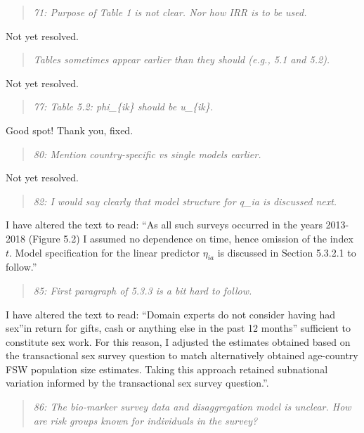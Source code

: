\documentclass[
  12pt,
]{article}
\begin{document}
\begin{quote}
\emph{71: Purpose of Table 1 is not clear. Nor how IRR is to be used.}
\end{quote}

Not yet resolved.

\begin{quote}
\emph{Tables sometimes appear earlier than they should (e.g., 5.1 and
5.2).}
\end{quote}

Not yet resolved.

\begin{quote}
\emph{77: Table 5.2: phi\_\{ik\} should be u\_\{ik\}.}
\end{quote}

Good spot! Thank you, fixed.

\begin{quote}
\emph{80: Mention country-specific vs single models earlier.}
\end{quote}

Not yet resolved.

\begin{quote}
\emph{82: I would say clearly that model structure for q\_ia is
discussed next.}
\end{quote}

I have altered the text to read: ``As all such surveys occurred in the
years 2013-2018 (Figure 5.2) I assumed no dependence on time, hence
omission of the index \(t\). Model specification for the linear
predictor \(\eta_{ia}\) is discussed in Section 5.3.2.1 to follow.''

\begin{quote}
\emph{85: First paragraph of 5.3.3 is a bit hard to follow.}
\end{quote}

I have altered the text to read: ``Domain experts do not consider having
had sex''in return for gifts, cash or anything else in the past 12
months'' sufficient to constitute sex work. For this reason, I adjusted
the estimates obtained based on the transactional sex survey question to
match alternatively obtained age-country FSW population size estimates.
Taking this approach retained subnational variation informed by the
transactional sex survey question.''.

\begin{quote}
\emph{86: The bio-marker survey data and disaggregation model is
unclear. How are risk groups known for individuals in the survey?}
\end{quote}
\end{document}
